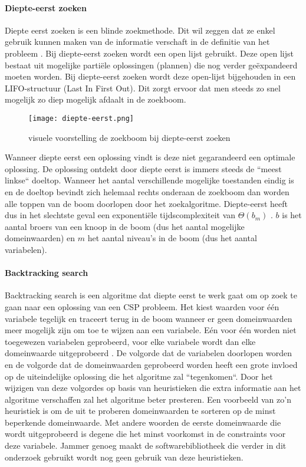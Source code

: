 \paragraph{Diepte-eerst zoeken}
Diepte eerst zoeken is een blinde zoekmethode. Dit wil zeggen dat ze enkel gebruik kunnen maken van de informatie verschaft in de definitie van het probleem \autocite{lievens}. Bij diepte-eerst zoeken wordt een open lijst gebruikt. Deze open lijst bestaat uit mogelijke partiële oplossingen (plannen) die nog verder geëxpandeerd moeten worden. Bij diepte-eerst zoeken wordt deze open-lijst bijgehouden in een LIFO-structuur (Last In First Out). Dit zorgt ervoor dat men steeds zo snel mogelijk zo diep mogelijk afdaalt in de zoekboom. \begin{figure}[h]
	\texttt{[image: diepte-eerst.png]}
	\caption{visuele voorstelling de zoekboom bij diepte-eerst zoeken}
\end{figure}
Wanneer diepte eerst een oplossing vindt is deze niet gegarandeerd een optimale oplossing. De oplossing ontdekt door diepte eerst is immers steeds de ``meest linkse`` doeltop. Wanneer het aantal verschillende mogelijke toestanden eindig is en de doeltop bevindt zich helemaal rechts onderaan de zoekboom dan worden alle toppen van de boom doorlopen door het zoekalgoritme. Diepte-eerst heeft dus in het slechtste geval een exponentiële tijdscomplexiteit van $\Theta(b_{m})$ \autocite{lievens}. $b$ is het aantal broers van een knoop in de boom (dus het aantal mogelijke domeinwaarden) en $m$ het aantal niveau's in de boom (dus het aantal variabelen).

\paragraph{Backtracking search}
Backtracking search is een algoritme dat diepte eerst te werk gaat om op zoek te gaan naar een oplossing van een CSP probleem. Het kiest waarden voor één variabele tegelijk en traceert terug in de boom wanneer er geen domeinwaarden meer mogelijk zijn om toe te wijzen aan een variabele. Eén voor één worden niet toegewezen variabelen geprobeerd, voor elke variabele wordt dan elke domeinwaarde uitgeprobeerd \autocite{norvig}. De volgorde dat de variabelen doorlopen worden en de volgorde dat de domeinwaarden geprobeerd worden heeft een grote invloed op de uiteindelijke oplossing die het algoritme zal ``tegenkomen``. Door het wijzigen van deze volgordes op basis van heuristieken die extra informatie aan het algoritme verschaffen zal het algoritme beter presteren. Een voorbeeld van zo'n heuristiek is om de uit te proberen domeinwaarden te sorteren op de minst beperkende domeinwaarde. Met andere woorden de eerste domeinwaarde die wordt uitgeprobeerd is degene die het minst voorkomst in de constraints voor deze variabele. Jammer genoeg maakt de softwarebibliotheek die verder in dit onderzoek gebruikt wordt nog geen gebruik van deze heuristieken.

